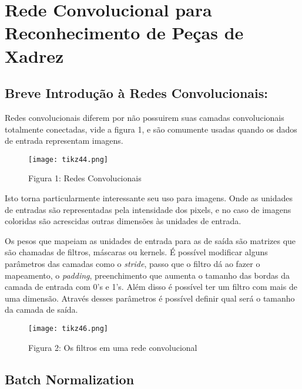 






\section{Rede Convolucional para Reconhecimento de Peças de
Xadrez}\label{rede-convolucional}

    \subsection{Breve Introdução à Redes
Convolucionais:}\label{breve-introducao-a-redes-convolucionais}

Redes convolucionais diferem por não possuirem suas camadas convolucionais totalmente
conectadas, vide a figura 1, e são comumente usadas quando os dados de entrada
representam imagens.

\begin{figure}[ht]
\centering
\texttt{[image: tikz44.png]}
\caption{Figura 1: Redes Convolucionais}
\end{figure}

Isto torna particularmente interessante seu uso para imagens. Onde as
unidades de entradas são representadas pela intensidade dos pixels, e
no caso de imagens coloridas são acrescidas outras dimensões às
unidades de entrada.

Os pesos que mapeiam as unidades de entrada para as de saída são
matrizes que são chamadas de filtros, máscaras ou kernels. É possível
modificar alguns parâmetros das camadas como o \emph{stride}, passo que
o filtro dá ao fazer o mapeamento, o \emph{padding}, preenchimento que
aumenta o tamanho das bordas da camada de entrada com 0's e 1's. Além
disso é possível ter um filtro com mais de uma dimensão. Através desses
parâmetros é possível definir qual será o tamanho da camada de saída.

\begin{figure}[ht]
\centering
\texttt{[image: tikz46.png]}
\caption{Figura 2: Os filtros em uma rede convolucional}
\end{figure}

        \subsection{Batch Normalization}\label{batch-normalization}

